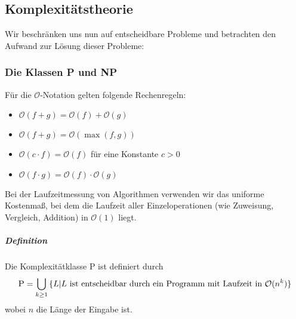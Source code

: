 \documentclass[a4paper]{scrartcl}
\begin{document}
\subsection{Komplexitätstheorie}
Wir beschränken uns nun auf entscheidbare Probleme und betrachten den Aufwand zur Lösung dieser Probleme:

\subsubsection{Die Klassen P und NP}
Für die $\mathcal{O}$-Notation gelten folgende Rechenregeln:
\begin{itemize}
\item $\mathcal{O} (f+g) = \mathcal{O} (f) + \mathcal{O} (g)$
\item $\mathcal{O} (f+g) = \mathcal{O} (\max{(f,g)})$
\item $\mathcal{O} (c\cdot f) = \mathcal{O} (f)$ für eine Konstante $c >0$
\item $\mathcal{O} (f \cdot g) = \mathcal{O} (f) \cdot \mathcal{O} (g)$
\end{itemize}
Bei der Laufzeitmessung von Algorithmen verwenden wir das uniforme Kostenmaß, bei dem die Laufzeit aller Einzeloperationen (wie Zuweisung, Vergleich, Addition) in $\mathcal{O} (1)$ liegt.

\subparagraph{Definition} Die Komplexitätklasse \textsc{P} ist definiert durch 
\[ \textsc{P} = \bigcup\limits_{k \geq 1} \, \{ L | L \text{ ist entscheidbar durch ein Programm mit Laufzeit in } \mathcal{O} (n^k) \} \]
wobei $n$ die Länge der Eingabe ist.
\end{document}
